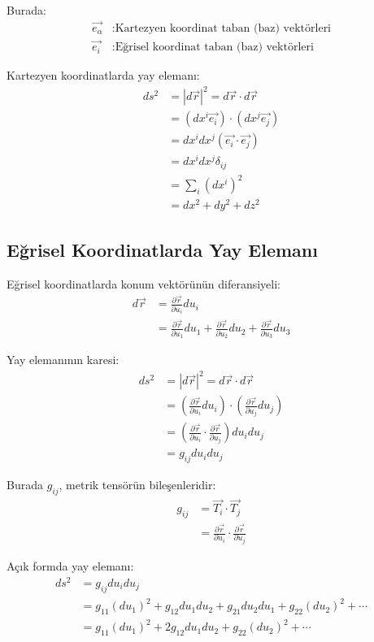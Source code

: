 \documentclass[11pt,letterpaper,twocolumn]{fenbil}
\begin{document}
Burada:
\begin{align}
\vec{e_{\alpha}} &: \text{Kartezyen koordinat taban (baz) vektörleri} \\
\vec{e_i} &: \text{Eğrisel koordinat taban (baz) vektörleri}
\end{align}

Kartezyen koordinatlarda yay elemanı:
\begin{align}
ds^2 &= |d\vec{r}|^2 = d\vec{r} \cdot d\vec{r} \\
&= (dx^i\vec{e_i}) \cdot (dx^j\vec{e_j}) \\
&= dx^i dx^j (\vec{e_i} \cdot \vec{e_j}) \\
&= dx^i dx^j \delta_{ij} \\
&= \sum_i (dx^i)^2 \\
&= dx^2 + dy^2 + dz^2
\end{align}

\subsection{Eğrisel Koordinatlarda Yay Elemanı}

Eğrisel koordinatlarda konum vektörünün diferansiyeli:
\begin{align}
d\vec{r} &= \frac{\partial \vec{r}}{\partial u_i}du_i \\
&= \frac{\partial \vec{r}}{\partial u_1}du_1 + \frac{\partial \vec{r}}{\partial u_2}du_2 + \frac{\partial \vec{r}}{\partial u_3}du_3
\end{align}

Yay elemanının karesi:
\begin{align}
ds^2 &= |d\vec{r}|^2 = d\vec{r} \cdot d\vec{r} \\
&= \left(\frac{\partial \vec{r}}{\partial u_i}du_i\right) \cdot \left(\frac{\partial \vec{r}}{\partial u_j}du_j\right) \\
&= \left(\frac{\partial \vec{r}}{\partial u_i} \cdot \frac{\partial \vec{r}}{\partial u_j}\right)du_i du_j \\
&= g_{ij}du_i du_j
\end{align}

Burada $g_{ij}$, metrik tensörün bileşenleridir:
\begin{align}
g_{ij} &= \vec{T_i} \cdot \vec{T_j} \\
&= \frac{\partial \vec{r}}{\partial u_i} \cdot \frac{\partial \vec{r}}{\partial u_j}
\end{align}

Açık formda yay elemanı:
\begin{align}
ds^2 &= g_{ij}du_i du_j \\
&= g_{11}(du_1)^2 + g_{12}du_1 du_2 + g_{21}du_2 du_1 + g_{22}(du_2)^2 + \cdots \\
&= g_{11}(du_1)^2 + 2g_{12}du_1 du_2 + g_{22}(du_2)^2 + \cdots
\end{align}
\end{document}
